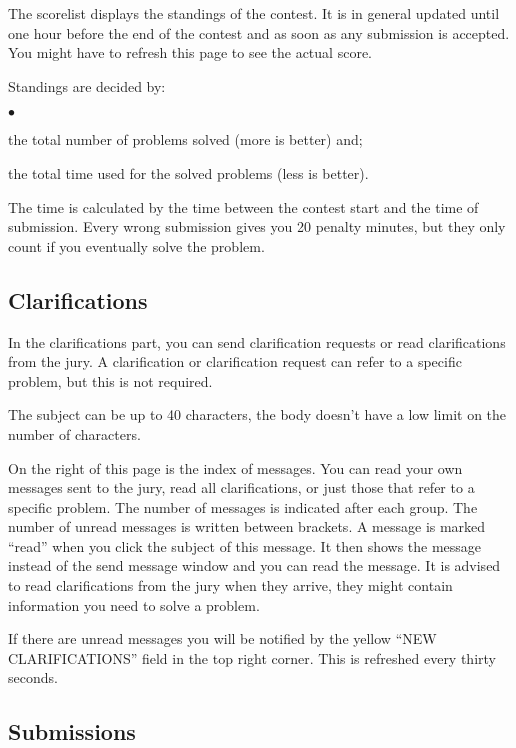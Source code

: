 \documentclass[a4paper]{artikel3}
\newenvironment{citemize}
  {\begin{list}{$\bullet$}{\topsep 0cm \itemsep 0cm}}
  {\end{list}}
\begin{document}
The scorelist displays the standings of the contest. It is in general
updated until one hour before the end of the contest and as soon as any
submission is accepted. You might have to refresh this page to see the
actual score.

Standings are decided by:

\begin{citemize}
\item the total number of problems solved (more is better) and;
\item the total time used for the solved problems (less is better).
\end{citemize}

The time is calculated by the time between the contest start and the time of
submission. Every wrong submission gives you 20 penalty minutes, but they
only count if you eventually solve the problem.

\vspace{-0.3cm}
\subsection{Clarifications}
\vspace{-0.2cm}

In the clarifications part, you can send clarification requests or read
clarifications from the jury. A clarification or clarification request can
refer to a specific problem, but this is not required.

The subject can be up to 40 characters, the body doesn't have a low
limit on the number of characters.

On the right of this page is the index of messages. You can read your own
messages sent to the jury, read all clarifications, or just those that refer
to a specific problem. The number of messages is indicated after each group.
The number of unread messages is written between brackets. A message is
marked ``read'' when you click the subject of this message. It then shows
the message instead of the send message window and you can read the message.
It is advised to read clarifications from the jury when they arrive, they
might contain information you need to solve a problem.

If there are unread messages you will be notified by the yellow ``NEW
CLARIFICATIONS'' field in the top right corner. This is refreshed every
thirty seconds.

\vspace{-0.3cm}
\subsection{Submissions}
\vspace{-0.2cm}
\end{document}
